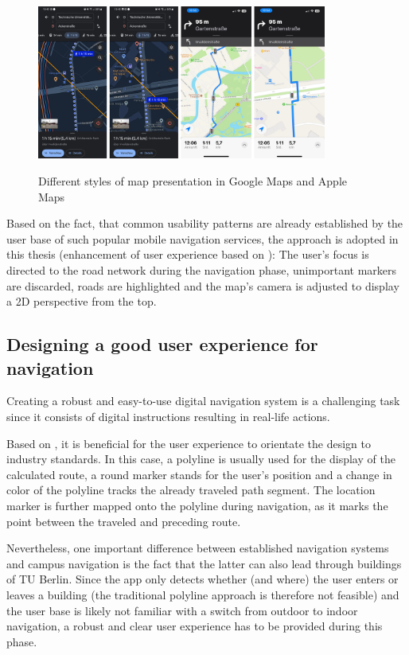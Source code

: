 \begin{figure}[H]
	\centering
	\includegraphics[width=0.85\textwidth]{images/map_design_google_apple.png}\\
	\caption{Different styles of map presentation in Google Maps and Apple Maps}
\end{figure}

Based on the fact, that common usability patterns are already established by the user base of such popular mobile navigation services, the approach is adopted in this thesis (enhancement of user experience based on \cite{jakobs_law}): The user's focus is directed to the road network during the navigation phase, unimportant markers are discarded, roads are highlighted and the map's camera is adjusted to display a 2D perspective from the top.

\subsection{Designing a good user experience for navigation}
Creating a robust and easy-to-use digital navigation system is a challenging task since it consists of digital instructions resulting in real-life actions.

Based on \cite{jakobs_law}, it is beneficial for the user experience to orientate the design to industry standards. In this case, a polyline is usually used for the display of the calculated route, a round marker stands for the user's position and a change in color of the polyline tracks the already traveled path segment. The location marker is further mapped onto the polyline during navigation, as it marks the point between the traveled and preceding route.

Nevertheless, one important difference between established navigation systems and campus navigation is the fact that the latter can also lead through buildings of TU Berlin. Since the app only detects whether (and where) the user enters or leaves a building (the traditional polyline approach is therefore not feasible) and the user base is likely not familiar with a switch from outdoor to indoor navigation, a robust and clear user experience has to be provided during this phase.

